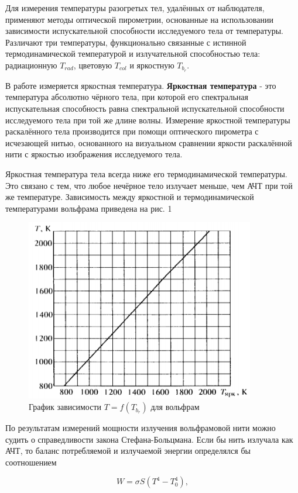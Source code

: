 \documentclass[a4paper, 12pt]{article}
\begin{document}
Для измерения температуры разогретых тел, удалённых от наблюдателя, применяют методы оптической пирометрии, основанные на использовании зависимости испускательной способности исследуемого тела от температуры. Различают три температуры, функционально связанные с истинной термодинамической температурой и излучательной способностью тела: радиационную $T_{rad}$, цветовую $T_{col}$ и яркостную $T_b_r$. \par
В работе измеряется яркостная температура. \textbf{Яркостная температура} - это температура абсолютно чёрного тела, при которой его спектральная испускательная способность равна спектральной испускательной способности исследуемого тела при той же длине волны.
 Измерение яркостной температуры раскалённого тела производится при помощи оптического пирометра с исчезающей нитью, основанного на визуальном сравнении яркости раскалённой нити с яркостью изображения исследуемого тела. \par
Яркостная температура тела всегда ниже его термодинамической температуры. Это связано с тем, что любое нечёрное тело излучает меньше, чем АЧТ при той же температуре. Зависимость между яркостной и термодинамической температурами вольфрама приведена на рис. 1

\begin{figure}[h]
    \centering
    \includegraphics[width=10cm]{fig2.PNG}
    \caption{График зависимости $T = f(T_b_r)$ для вольфрам}
    \label{fig:vac}
\end{figure}

По результатам измерений мощности излучения вольфрамовой нити можно судить о справедливости закона Стефана-Больцмана. Если бы нить излучала как АЧТ, то баланс потребляемой и излучаемой энергии определялся бы соотношением 

\begin{equation}
    W = \sigma S (T^4 - T_0^4),
\end{equation}
\end{document}
